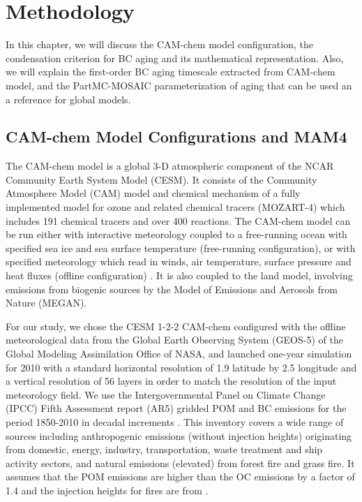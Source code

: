 \documentclass[12pt, fullpage]{uiucthesis2009_2}
\begin{document}
	\chapter{Methodology}
	In this chapter, we will discuss the CAM-chem model configuration, the condensation criterion for BC aging and its mathematical representation. Also, we will explain the first-order BC aging timescale extracted from CAM-chem model, and the PartMC-MOSAIC parameterization of aging that can be used an a reference for global models.
	
	\section{CAM-chem Model Configurations and MAM4}
	
	The CAM-chem model is a global 3-D atmospheric component of the NCAR Community Earth System Model (CESM). It consists of the Community Atmosphere Model (CAM) model and chemical mechanism of a fully implemented model for ozone and related chemical tracers (MOZART-4) which includes 191 chemical tracers and over 400 reactions. The CAM-chem model can be run either with interactive meteorology coupled to a free-running ocean with specified sea ice and sea surface temperature (free-running configuration), or with specified meteorology which read in winds, air temperature, surface pressure and heat fluxes (offline configuration) \citep{Lamarque2012}. It is also coupled to the land model, involving emissions from biogenic sources by the Model of Emissions and Aerosols from Nature (MEGAN). 
	
	For our study, we chose the CESM 1-2-2 CAM-chem configured with the offline meteorological data from the Global Earth Observing System (GEOS-5) of the Global Modeling Assimilation Office of NASA, and launched one-year simulation for 2010 with a standard horizontal resolution of 1.9  latitude by 2.5 longitude and a vertical resolution of 56 layers in order to match the resolution of the input meteorology field. We use the Intergovernmental Panel on Climate Change (IPCC) Fifth Assessment report (AR5) gridded POM and BC emissions for the period 1850-2010 in decadal increments \citep{Lamarque2010}. This inventory covers a wide range of sources including anthropogenic emissions (without injection heights) originating from domestic, energy, industry, transportation, waste treatment and ship activity sectors, and natural emissions (elevated) from forest fire and grass fire. It assumes that the POM emissions are higher than the OC emissions by a factor of 1.4 \citep{Liu2012} and the injection heights for fires are from \citet{dentener2006emissions}. 
\end{document}
